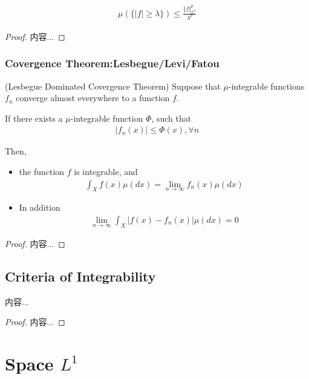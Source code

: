 \documentclass[Total.tex]{subfiles}
\begin{document}
			\begin{corollary} 
				\begin{gather*}
					\mu(\{|f|\geq \lambda\})\leq \frac{\Vert f\Vert^p_{L^p}}{\lambda^p}
				\end{gather*}
			\end{corollary}
			\begin{proof}
				内容...
			\end{proof}
			\subsubsection{Covergence Theorem:Lesbegue/Levi/Fatou}
				
				\begin{theorem}
					(Lesbegue Dominated Covergence Theorem) Suppose that $\mu$-integrable functions $f_n$ converge almost everywhere to a function $f$.
					
					If there exists a $\mu$-integrable function $\Phi$, such that
					\begin{gather*}
						|f_n(x)|\leq \Phi(x),\forall n
					\end{gather*}
					
					Then, 
					\begin{itemize}
						\item the function $f$ is integrable, and 
						\begin{gather*}
							\int_X f(x)\mu(dx)=\lim_{n\rightarrow\infty} f_n(x)\mu(dx)
						\end{gather*}
						\item In addition
						\begin{gather*}
							\lim_{n\rightarrow\infty} \int_X|f(x)-f_n(x)|\mu(dx)=0
						\end{gather*}
					\end{itemize}
				\end{theorem}
				\begin{proof}
					内容...
				\end{proof}
			
			\subsection{Criteria of Integrability}
				\begin{theorem}
					内容...
				\end{theorem}
				\begin{proof}
					内容...
				\end{proof}
		\section{Space $L^1$}
			
\end{document}
